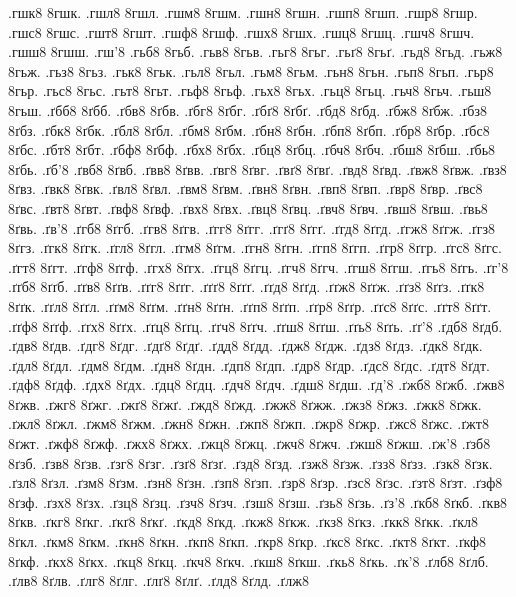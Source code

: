 {.гшк8
8гшк.
.гшл8
8гшл.
.гшм8
8гшм.
.гшн8
8гшн.
.гшп8
8гшп.
.гшр8
8гшр.
.гшс8
8гшс.
.гшт8
8гшт.
.гшф8
8гшф.
.гшх8
8гшх.
.гшц8
8гшц.
.гшч8
8гшч.
.гшш8
8гшш.
.гш'8
.гьб8
8гьб.
.гьв8
8гьв.
.гьг8
8гьг.
.гьґ8
8гьґ.
.гьд8
8гьд.
.гьж8
8гьж.
.гьз8
8гьз.
.гьк8
8гьк.
.гьл8
8гьл.
.гьм8
8гьм.
.гьн8
8гьн.
.гьп8
8гьп.
.гьр8
8гьр.
.гьс8
8гьс.
.гьт8
8гьт.
.гьф8
8гьф.
.гьх8
8гьх.
.гьц8
8гьц.
.гьч8
8гьч.
.гьш8
8гьш.
.ґбб8
8ґбб.
.ґбв8
8ґбв.
.ґбг8
8ґбг.
.ґбґ8
8ґбґ.
.ґбд8
8ґбд.
.ґбж8
8ґбж.
.ґбз8
8ґбз.
.ґбк8
8ґбк.
.ґбл8
8ґбл.
.ґбм8
8ґбм.
.ґбн8
8ґбн.
.ґбп8
8ґбп.
.ґбр8
8ґбр.
.ґбс8
8ґбс.
.ґбт8
8ґбт.
.ґбф8
8ґбф.
.ґбх8
8ґбх.
.ґбц8
8ґбц.
.ґбч8
8ґбч.
.ґбш8
8ґбш.
.ґбь8
8ґбь.
.ґб'8
.ґвб8
8ґвб.
.ґвв8
8ґвв.
.ґвг8
8ґвг.
.ґвґ8
8ґвґ.
.ґвд8
8ґвд.
.ґвж8
8ґвж.
.ґвз8
8ґвз.
.ґвк8
8ґвк.
.ґвл8
8ґвл.
.ґвм8
8ґвм.
.ґвн8
8ґвн.
.ґвп8
8ґвп.
.ґвр8
8ґвр.
.ґвс8
8ґвс.
.ґвт8
8ґвт.
.ґвф8
8ґвф.
.ґвх8
8ґвх.
.ґвц8
8ґвц.
.ґвч8
8ґвч.
.ґвш8
8ґвш.
.ґвь8
8ґвь.
.ґв'8
.ґгб8
8ґгб.
.ґгв8
8ґгв.
.ґгг8
8ґгг.
.ґгґ8
8ґгґ.
.ґгд8
8ґгд.
.ґгж8
8ґгж.
.ґгз8
8ґгз.
.ґгк8
8ґгк.
.ґгл8
8ґгл.
.ґгм8
8ґгм.
.ґгн8
8ґгн.
.ґгп8
8ґгп.
.ґгр8
8ґгр.
.ґгс8
8ґгс.
.ґгт8
8ґгт.
.ґгф8
8ґгф.
.ґгх8
8ґгх.
.ґгц8
8ґгц.
.ґгч8
8ґгч.
.ґгш8
8ґгш.
.ґгь8
8ґгь.
.ґг'8
.ґґб8
8ґґб.
.ґґв8
8ґґв.
.ґґг8
8ґґг.
.ґґґ8
8ґґґ.
.ґґд8
8ґґд.
.ґґж8
8ґґж.
.ґґз8
8ґґз.
.ґґк8
8ґґк.
.ґґл8
8ґґл.
.ґґм8
8ґґм.
.ґґн8
8ґґн.
.ґґп8
8ґґп.
.ґґр8
8ґґр.
.ґґс8
8ґґс.
.ґґт8
8ґґт.
.ґґф8
8ґґф.
.ґґх8
8ґґх.
.ґґц8
8ґґц.
.ґґч8
8ґґч.
.ґґш8
8ґґш.
.ґґь8
8ґґь.
.ґґ'8
.ґдб8
8ґдб.
.ґдв8
8ґдв.
.ґдг8
8ґдг.
.ґдґ8
8ґдґ.
.ґдд8
8ґдд.
.ґдж8
8ґдж.
.ґдз8
8ґдз.
.ґдк8
8ґдк.
.ґдл8
8ґдл.
.ґдм8
8ґдм.
.ґдн8
8ґдн.
.ґдп8
8ґдп.
.ґдр8
8ґдр.
.ґдс8
8ґдс.
.ґдт8
8ґдт.
.ґдф8
8ґдф.
.ґдх8
8ґдх.
.ґдц8
8ґдц.
.ґдч8
8ґдч.
.ґдш8
8ґдш.
.ґд'8
.ґжб8
8ґжб.
.ґжв8
8ґжв.
.ґжг8
8ґжг.
.ґжґ8
8ґжґ.
.ґжд8
8ґжд.
.ґжж8
8ґжж.
.ґжз8
8ґжз.
.ґжк8
8ґжк.
.ґжл8
8ґжл.
.ґжм8
8ґжм.
.ґжн8
8ґжн.
.ґжп8
8ґжп.
.ґжр8
8ґжр.
.ґжс8
8ґжс.
.ґжт8
8ґжт.
.ґжф8
8ґжф.
.ґжх8
8ґжх.
.ґжц8
8ґжц.
.ґжч8
8ґжч.
.ґжш8
8ґжш.
.ґж'8
.ґзб8
8ґзб.
.ґзв8
8ґзв.
.ґзг8
8ґзг.
.ґзґ8
8ґзґ.
.ґзд8
8ґзд.
.ґзж8
8ґзж.
.ґзз8
8ґзз.
.ґзк8
8ґзк.
.ґзл8
8ґзл.
.ґзм8
8ґзм.
.ґзн8
8ґзн.
.ґзп8
8ґзп.
.ґзр8
8ґзр.
.ґзс8
8ґзс.
.ґзт8
8ґзт.
.ґзф8
8ґзф.
.ґзх8
8ґзх.
.ґзц8
8ґзц.
.ґзч8
8ґзч.
.ґзш8
8ґзш.
.ґзь8
8ґзь.
.ґз'8
.ґкб8
8ґкб.
.ґкв8
8ґкв.
.ґкг8
8ґкг.
.ґкґ8
8ґкґ.
.ґкд8
8ґкд.
.ґкж8
8ґкж.
.ґкз8
8ґкз.
.ґкк8
8ґкк.
.ґкл8
8ґкл.
.ґкм8
8ґкм.
.ґкн8
8ґкн.
.ґкп8
8ґкп.
.ґкр8
8ґкр.
.ґкс8
8ґкс.
.ґкт8
8ґкт.
.ґкф8
8ґкф.
.ґкх8
8ґкх.
.ґкц8
8ґкц.
.ґкч8
8ґкч.
.ґкш8
8ґкш.
.ґкь8
8ґкь.
.ґк'8
.ґлб8
8ґлб.
.ґлв8
8ґлв.
.ґлг8
8ґлг.
.ґлґ8
8ґлґ.
.ґлд8
8ґлд.
.ґлж8
}
